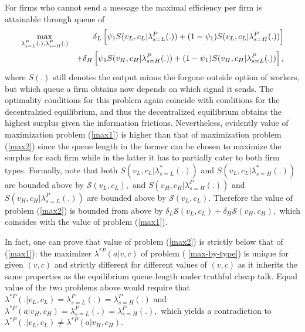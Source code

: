 \documentclass[12pt]{article}
\begin{document}
For firms who cannot send a message the maximal efficiency per firm is
attainable through queue of 
\begin{eqnarray}
\max_{\lambda _{s=L}^{P}(.),\lambda _{s=H}^{P}(.)} &&\delta _{L}\left[ \psi
_{1}S(v_{L},c_{L}|\lambda _{s=L}^{P}(.))+(1-\psi _{1})S(v_{L},c_{L}|\lambda
_{s=H}^{P}(.))\right]  \label{max2} \\
&&+\delta _{H}\left[ \psi _{1}S(v_{H},c_{H}|\lambda _{s=H}^{P}(.))+(1-\psi
_{1})S(v_{H},c_{H}|\lambda _{s=L}^{P}(.))\right] ,  \notag
\end{eqnarray}%
where $S(.)$ still denotes the output minus the forgone outside option of
workers, but which queue a firm obtains now depends on which signal it
sends. The optimality conditions for this problem again coincide with
conditions for the decentralzied equilibrium, and thus the decentralized
equilibrium obtains the highest surplus given the information frictions.
Nevertheless, evidently value of maximization problem (\ref{max1}) is higher
than that of maximization problem (\ref{max2}) since the queue length in the
former can be chosen to maximize the surplus for each firm while in the
latter it has to partially cater to both firm types. Formally, note that
both $S(v_{L},c_{L}|\lambda _{s=L}^{\ast }(.))$ and $S(v_{L},c_{L}|\lambda
_{s=H}^{\ast }(.))$ are bounded above by $\mathcal{S}(v_{L},c_{L}),$ and $%
S(v_{H},c_{H}|\lambda _{s=H}^{P}(.))$ and $S(v_{H},c_{H}|\lambda
_{s=L}^{P}(.))$ are bounded above by $\mathcal{S}(v_{L},c_{L}).$ Therefore
the value of problem (\ref{max2}) is bounded from above by $\delta _{L}%
\mathcal{S}(v_{L},c_{L})+\delta _{H}\mathcal{S}(v_{H},c_{H}),$ which
coincides with the value of problem (\ref{max1}).

In fact, one can prove that value of problem (\ref{max2}) is strictly below
that of (\ref{max1}): the maximizer $\lambda ^{\ast P}(a|v,c)$ of problem (%
\ref{max-by-type}) is unique for given $(v,c)$ and strictly different for
different values of $(v,c)$ as it inherits the same properties as the
equilibrium queue length under truthful cheap talk. Equal value of the two
problems above would require that $\lambda ^{\ast
P}(.|v_{L},c_{L})=\lambda _{s=L}^{P}(.)=\lambda _{s=H}^{P}(.)$ and $%
\lambda ^{\ast P}(a|v_{H},c_{H})=\lambda _{s=L}^{P}(.)=\lambda
_{s=H}^{P}(.), $ which yields a contradiction to $\lambda ^{\ast
P}(.|v_{L},c_{L})\neq \lambda ^{\ast P}(a|v_{H},c_{H}).$
\end{document}
